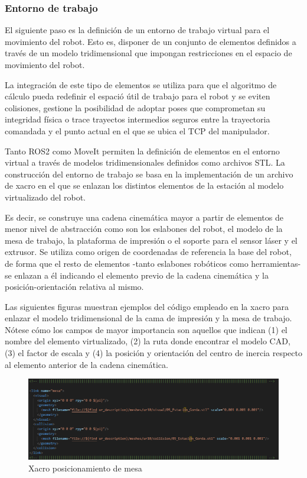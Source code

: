 \subsubsection*{Entorno de trabajo}
\hypertarget{Entorno de trabajo trayectorias}{}

El siguiente paso es la definición de un entorno de trabajo virtual para el movimiento del robot. Esto es, disponer de un conjunto de elementos definidos a través de un modelo tridimensional que impongan restricciones en el espacio de movimiento del robot. 

La integración de este tipo de elementos se utiliza para que el algoritmo de cálculo pueda redefinir el espació útil de trabajo para el robot y se eviten colisiones, gestione la posibilidad de adoptar poses que comprometan su integridad física o trace trayectos intermedios seguros entre la trayectoria comandada y el punto actual en el que se ubica el \acrshort{TCP} del manipulador.

Tanto ROS2 como MoveIt permiten la definición de elementos en el entorno virtual a través de modelos tridimensionales definidos como archivos \acrshort{STL}. La construcción del entorno de trabajo se basa en la implementación de un archivo de xacro en el que se enlazan los distintos elementos de la estación al modelo virtualizado del robot. 

Es decir, se construye una cadena cinemática mayor a partir de elementos de menor nivel de abstracción como son los eslabones del robot, el modelo de la mesa de trabajo, la plataforma de impresión o el soporte para el sensor láser y el extrusor. Se utiliza como origen de coordenadas de referencia la base del robot, de forma que el resto de elementos -tanto eslabones robóticos como herramientas- se enlazan a él indicando el elemento previo de la cadena cinemática y la posición-orientación relativa al mismo. 

Las siguientes figuras muestran ejemplos del código empleado en la xacro para enlazar el modelo tridimensional de la cama de impresión y la mesa de trabajo. Nótese cómo los campos de mayor importancia son aquellos que indican (1) el nombre del elemento virtualizado, (2) la ruta donde encontrar el modelo \acrshort{CAD}, (3) el factor de escala y (4) la posición y orientación del centro de inercia respecto al elemento anterior de la cadena cinemática. 

\begin{figure}[h!]
    \centering
    \includegraphics[scale=0.50]{figuras/posicionamiento xacro mesa estacion.png}
    \caption{Xacro posicionamiento de mesa}
    \label{fig: posicionamiento xacro mesa estacion}
\end{figure}

